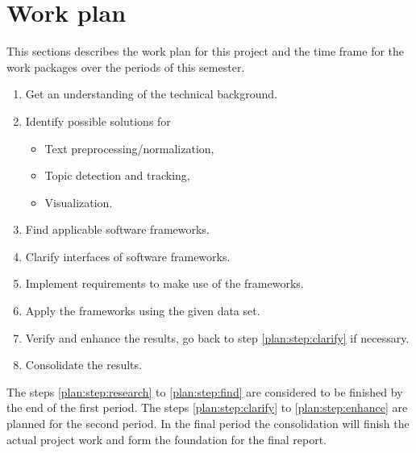 \section{Work plan}\label{sec:plan}

This sections describes the work plan for this project and the time frame for the work packages over the periods of this semester.

\begin{enumerate}
	\item Get an understanding of the technical background. \label{plan:step:research}
	\item Identify possible solutions for
	\begin{itemize}
	    \item Text preprocessing/normalization,
		\item Topic detection and tracking,
		\item Visualization.
	\end{itemize}
	\item Find applicable software frameworks. \label{plan:step:find}
	\item Clarify interfaces of software frameworks. \label{plan:step:clarify}
	\item Implement requirements to make use of the frameworks.
	\item Apply the frameworks using the given data set.
	\item Verify and enhance the results, go back to step \ref{plan:step:clarify} if necessary. \label{plan:step:enhance}
	\item Consolidate the results.
\end{enumerate}

The steps \ref{plan:step:research} to \ref{plan:step:find} are considered to be finished by the end of the first period. The steps \ref{plan:step:clarify} to \ref{plan:step:enhance} are planned for the second period. In the final period the consolidation will finish the actual project work and form the foundation for the final report.